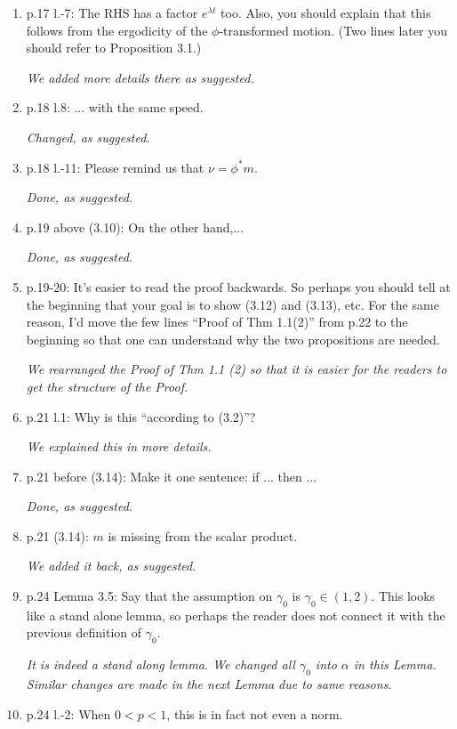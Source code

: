 \documentclass[12pt,a4paper]{amsart}
\numberwithin{equation}{section}
\theoremstyle{plain}
\theoremstyle{definition}
\begin{document}
\begin{enumerate}
  {\it We gave an intuitive explanations in the paragraph before those bullet points. }
\item
  p.17 l.-7: The RHS has a factor $e^{\lambda t}$ too. 
  Also, you should explain that this follows from the ergodicity of the $\phi$-transformed motion.
  (Two lines later you should refer to Proposition 3.1.)
  
  {\it We added more details there as suggested.}
\item
  p.18 l.8: ... with the same speed.
  
  {\it Changed, as suggested.}
\item
  p.18 l.-11: Please remind us that $\nu = \phi^* m$.
  
  {\it Done, as suggested.}
\item
  p.19 above (3.10): On the other hand,...
  
  {\it Done, as suggested.}
\item 
  p.19-20: It's easier to read the proof backwards. So perhaps you should tell at the beginning that your goal is to show (3.12) and (3.13), etc.
  For the same reason, I'd move the few lines ``Proof of Thm 1.1(2)'' from p.22 to the beginning so that one can understand why the two propositions are needed.
  
  {\it We rearranged the Proof of Thm 1.1 (2) so that it is easier for the readers to get the structure of the Proof. }
\item
  p.21 l.1: Why is this ``according to (3.2)''?
  
  {\it We explained this in more details.}
\item
  p.21 before (3.14): Make it one sentence: if ... then ...
  
  {\it Done, as suggested.}
\item
  p.21 (3.14): $m$ is missing from the scalar product.
  
  {\it We added it back, as suggested.}
\item
  p.24 Lemma 3.5: Say that the assumption on $\gamma_0$ is $\gamma_0 \in (1,2)$. 
  This looks like a stand alone lemma, so perhaps the reader does not connect it with the previous definition of $\gamma_0$.
  
  {\it It is indeed a stand along lemma. 
    We changed all $\gamma_0$ into $\alpha$ in this Lemma.
    Similar changes are made in the next Lemma due to same reasons.}
\item
  p.24 l.-2: When $0 < p < 1$, this is in fact not even a norm.
  

\end{enumerate}
\end{document}
